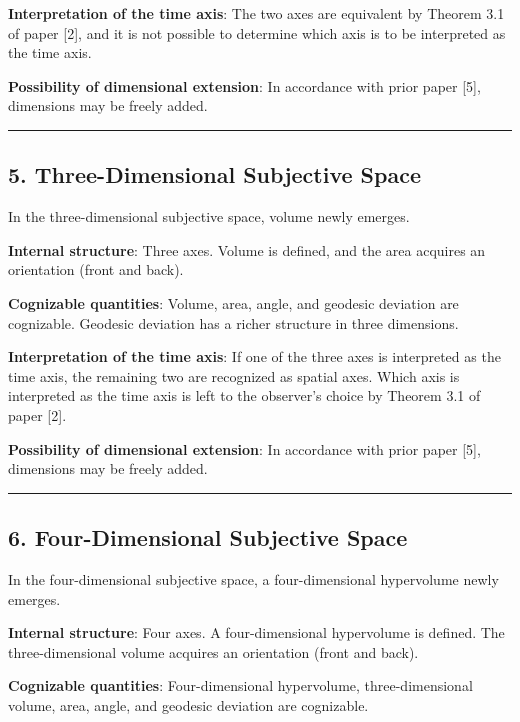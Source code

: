 \documentclass[a4paper,11pt]{article}
\theoremstyle{definition}
\begin{document}
\textbf{Interpretation of the time axis}: The two axes are equivalent by Theorem 3.1 of paper {[}2{]}, and it is not possible to determine which axis is to be interpreted as the time axis.

\textbf{Possibility of dimensional extension}: In accordance with prior paper {[}5{]}, dimensions may be freely added.

\begin{center}\rule{0.5\linewidth}{0.5pt}\end{center}

\subsection{5. Three-Dimensional Subjective Space}\label{three-dimensional-subjective-space}

In the three-dimensional subjective space, volume newly emerges.

\textbf{Internal structure}: Three axes. Volume is defined, and the area acquires an orientation (front and back).

\textbf{Cognizable quantities}: Volume, area, angle, and geodesic deviation are cognizable. Geodesic deviation has a richer structure in three dimensions.

\textbf{Interpretation of the time axis}: If one of the three axes is interpreted as the time axis, the remaining two are recognized as spatial axes. Which axis is interpreted as the time axis is left to the observer's choice by Theorem 3.1 of paper {[}2{]}.

\textbf{Possibility of dimensional extension}: In accordance with prior paper {[}5{]}, dimensions may be freely added.

\begin{center}\rule{0.5\linewidth}{0.5pt}\end{center}

\subsection{6. Four-Dimensional Subjective Space}\label{four-dimensional-subjective-space}

In the four-dimensional subjective space, a four-dimensional hypervolume newly emerges.

\textbf{Internal structure}: Four axes. A four-dimensional hypervolume is defined. The three-dimensional volume acquires an orientation (front and back).

\textbf{Cognizable quantities}: Four-dimensional hypervolume, three-dimensional volume, area, angle, and geodesic deviation are cognizable.
\end{document}
